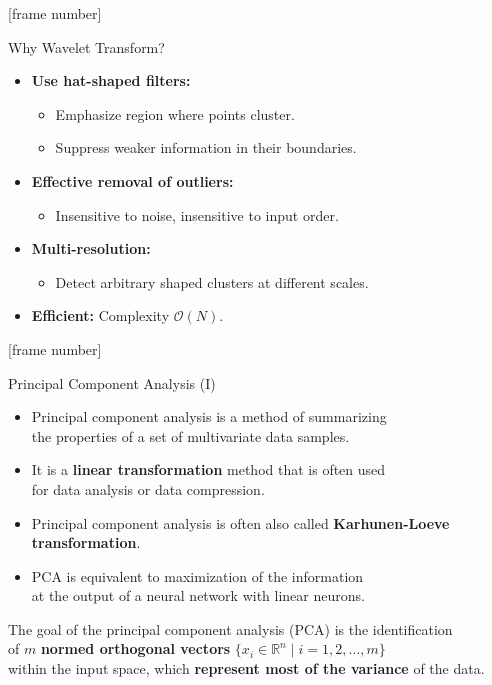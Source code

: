 \documentclass[aspectratio=169,t]{beamer}
\begin{document}
  {
    [frame number]
    \begin{frame}{Why Wavelet Transform?}
    \begin{itemize}
      \item \textbf{Use hat-shaped filters:}
      \begin{itemize}
        \item Emphasize region where points cluster.
        \item Suppress weaker information in their boundaries.
      \end{itemize}
      \item \textbf{Effective removal of outliers:}
      \begin{itemize}
        \item Insensitive to noise, insensitive to input order.
      \end{itemize}
      \item \textbf{Multi-resolution:}
      \begin{itemize}
        \item Detect arbitrary shaped clusters at different scales.
      \end{itemize}
      \item \textbf{Efficient:} Complexity $\mathcal{O}(N)$.
    \end{itemize}
    \end{frame}
  }

  {
    [frame number]
    \begin{frame}{Principal Component Analysis (I)}
    \begin{itemize}
      \item Principal component analysis is a method of summarizing \\
      the properties of a set of multivariate data samples.
      \item It is a \textbf{linear transformation} method that is often used \\ for data analysis or data compression.
      \item Principal component analysis is often also called \textbf{Karhunen-Loeve transformation}.
      \item PCA is equivalent to maximization of the information \\ at the output of a neural network with linear neurons.
    \end{itemize}
    \vspace{0.5cm}
    The goal of the principal component analysis (PCA) is the identification \\
    of $m$ \textbf{normed orthogonal vectors} $\{x_i \in \mathbb{R}^n \; \vert \; i = 1,2, \ldots,m \}$ \\
    within the input space, which \textbf{represent most of the variance} of the data.
    \end{frame}
  }
\end{document}
